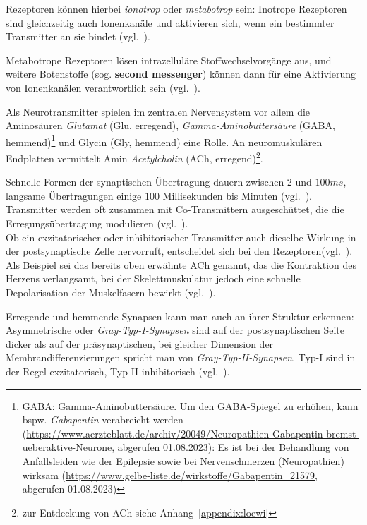 {Rezeptoren können hierbei \textit{ionotrop} oder \textit{metabotrop} sein: Inotrope Rezeptoren sind gleichzeitig auch Ionenkanäle und aktivieren sich, wenn ein bestimmter Transmitter an sie bindet (vgl.~\cite[109]{HS19b}).

Metabotrope Rezeptoren lösen intrazelluläre Stoffwechselvorgänge aus, und weitere Botenstoffe (sog. \textbf{second messenger}) können dann für eine Aktivierung von Ionenkanälen verantwortlich sein (vgl.~\cite[134]{RK18}).

Als Neurotransmitter spielen im zentralen Nervensystem vor allem die Aminosäuren \textit{Glutamat} (Glu, erregend), \textit{Gamma-Aminobuttersäure} (GABA, hemmend)\footnote{
    GABA: Gamma-Aminobuttersäure. Um den GABA-Spiegel zu erhöhen, kann bspw. \textit{Gabapentin} verabreicht werden (\url{https://www.aerzteblatt.de/archiv/20049/Neuropathien-Gabapentin-bremst-ueberaktive-Neurone}, abgerufen 01.08.2023): Es ist bei der Behandlung von Anfallsleiden wie der Epilepsie sowie bei Nervenschmerzen (Neuropathien) wirksam (\url{https://www.gelbe-liste.de/wirkstoffe/Gabapentin_21579}, abgerufen 01.08.2023)
} und Glycin (Gly, hemmend) eine Rolle. An neuromuskulären Endplatten vermittelt Amin \textit{Acetylcholin} (ACh, erregend)\footnote{zur Entdeckung von ACh siehe Anhang~\ref{appendix:loewi}}.

Schnelle Formen der synaptischen Übertragung dauern zwischen $2$ und $100ms$, langsame Übertragungen einige $100$ Millisekunden bis Minuten (vgl.~\cite[129 f.]{BCP18}). Transmitter werden oft zusammen mit Co-Transmittern ausgeschüttet, die die Erregungsübertragung modulieren (vgl.~\cite[52]{SD07}).\\

Ob ein exzitatorischer oder inhibitorischer Transmitter auch dieselbe Wirkung in der postsynaptische Zelle hervorruft, entscheidet sich bei den Rezeptoren(vgl.~\cite[109]{HS19b}). Als Beispiel sei das bereits oben erwähnte ACh genannt, das die Kontraktion des Herzens verlangsamt, bei der Skelettmuskulatur jedoch eine schnelle Depolarisation der Muskelfasern bewirkt (vgl.~\cite[137]{BCP18}).

Erregende und hemmende Synapsen kann man auch an ihrer Struktur erkennen: Asymmetrische oder \textit{Gray-Typ-I-Synapsen} sind auf der postsynaptischen Seite dicker als auf der präsynaptischen, bei gleicher Dimension der Membrandifferenzierungen spricht man von \textit{Gray-Typ-II-Synapsen}. Typ-I sind in der Regel exzitatorisch, Typ-II inhibitorisch (vgl.~\cite[127 u. 147]{BCP18}).


}
